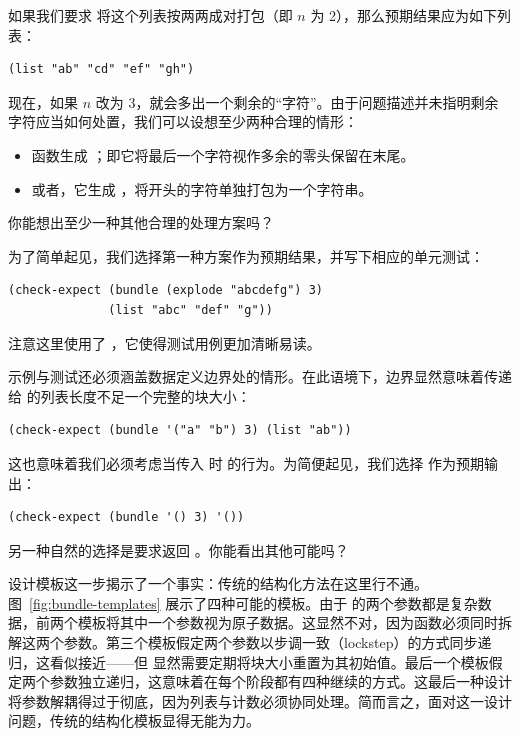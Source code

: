 如果我们要求  将这个列表按两两成对打包（即 $n$ 为 2），那么预期结果应为如下列表：

\begin{lstlisting}[language=BSL]
(list "ab" "cd" "ef" "gh")
\end{lstlisting}

现在，如果 $n$ 改为 3，就会多出一个剩余的“字符”。由于问题描述并未指明剩余字符应当如何处置，我们可以设想至少两种合理的情形：

\begin{itemize}
  \item 函数生成 ；即它将最后一个字符视作多余的零头保留在末尾。
  \item 或者，它生成 ，将开头的字符单独打包为一个字符串。
\end{itemize}

\begin{notebox}[思考停步]
你能想出至少一种其他合理的处理方案吗？
\end{notebox}

为了简单起见，我们选择第一种方案作为预期结果，并写下相应的单元测试：

\begin{lstlisting}[language=BSL]
(check-expect (bundle (explode "abcdefg") 3)
              (list "abc" "def" "g"))
\end{lstlisting}

注意这里使用了 ，它使得测试用例更加清晰易读。

示例与测试还必须涵盖数据定义边界处的情形。在此语境下，边界显然意味着传递给  的列表长度不足一个完整的块大小：

\begin{lstlisting}[language=BSL]
(check-expect (bundle '("a" "b") 3) (list "ab"))
\end{lstlisting}

这也意味着我们必须考虑当传入  时  的行为。为简便起见，我们选择  作为预期输出：

\begin{lstlisting}[language=BSL]
(check-expect (bundle '() 3) '())
\end{lstlisting}

另一种自然的选择是要求返回 。你能看出其他可能吗？

设计模板这一步揭示了一个事实：传统的结构化方法在这里行不通。图~\ref{fig:bundle-templates} 展示了四种可能的模板。由于  的两个参数都是复杂数据，前两个模板将其中一个参数视为原子数据。这显然不对，因为函数必须同时拆解这两个参数。第三个模板假定两个参数以步调一致（lockstep）的方式同步递归，这看似接近——但  显然需要定期将块大小重置为其初始值。最后一个模板假定两个参数独立递归，这意味着在每个阶段都有四种继续的方式。这最后一种设计将参数解耦得过于彻底，因为列表与计数必须协同处理。简而言之，面对这一设计问题，传统的结构化模板显得无能为力。

